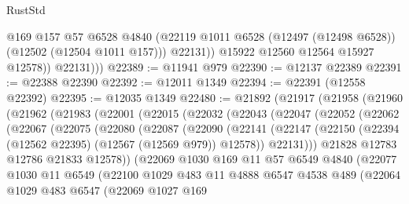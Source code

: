 \begin{lexlean}{RustStd}
\begin{coremodule}
                  @169
                  @157
                  @57
                  @6528
                  @4840
                  (@22119 @1011 @6528 (@12497 (@12498 @6528)) (@12502 (@12504 @1011 @157)))
                  @22131))
              @15922
              @12560
              @12564
              @15927
              @12578))
          @22131)))
@22389 := @11941 @979
@22390 := @12137 @22389
@22391 := @22388 @22390
@22392 := @12011 @1349
@22394 := @22391 (@12558 @22392)
@22395 := @12035 @1349
@22480 := @21892
    (@21917
      (@21958
        (@21960
          (@21962
            (@21983
              (@22001
                (@22015
                  (@22032
                    (@22043
                      (@22047
                        (@22052
                          (@22062
                            (@22067
                              (@22075
                                (@22080
                                  (@22087
                                    (@22090
                                      (@22141
                                        (@22147
                                          (@22150
                                            (@22394 (@12562 @22395) (@12567 (@12569 @979)) @12578))
                                          @22131)))
                                    @21828
                                    @12783
                                    @12786
                                    @21833
                                    @12578))
                                (@22069
                                  @1030
                                  @169
                                  @11
                                  @57
                                  @6549
                                  @4840
                                  (@22077
                                    @1030
                                    @11
                                    @6549
                                    (@22100
                                      @1029
                                      @483
                                      @11
                                      @4888
                                      @6547
                                      @4538
                                      @489
                                      (@22064
                                        @1029
                                        @483
                                        @6547
                                        (@22069
                                          @1027
                                          @169

\end{coremodule}
\end{lexlean}
